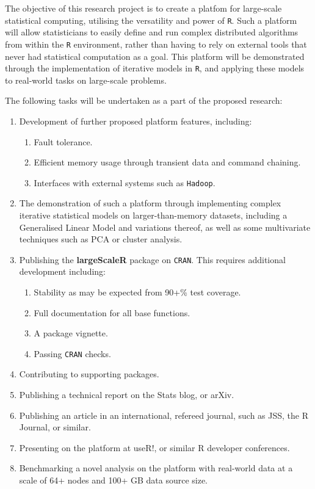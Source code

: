 The objective of this research project is to create a platfom for large-scale statistical computing, utilising the versatility and power of \texttt{R}.
Such a platform will allow statisticians to easily define and run complex distributed algorithms from within the \texttt{R} environment, rather than having to rely on external tools that never had statistical computation as a goal.
This platform will be demonstrated through the implementation of iterative models in \texttt{R}, and applying these models to real-world tasks on large-scale problems.

The following tasks will be undertaken as a part of the proposed research:

\begin{enumerate}
        \item Development of further proposed platform features, including:
                \begin{enumerate}
                        \item Fault tolerance.
                        \item Efficient memory usage through transient data and command chaining.
			\item Interfaces with external systems such as \texttt{Hadoop}.
                \end{enumerate}
        \item The demonstration of such a platform through implementing complex iterative statistical models on larger-than-memory datasets, including a Generalised Linear Model and variations thereof, as well as some multivariate techniques such as PCA or cluster analysis.
	\item Publishing the \textbf{largeScaleR} package on \texttt{CRAN}. This requires additional development including:
                \begin{enumerate}
                        \item Stability as may be expected from 90+\% test coverage.
                        \item Full documentation for all base functions.
                        \item A package vignette.
			\item Passing \texttt{CRAN} checks.
                \end{enumerate}
        \item Contributing to supporting packages.
        \item Publishing a technical report on the Stats blog, or arXiv.
	\item Publishing an article in an international, refereed journal, such as JSS, the R Journal, or similar.
        \item Presenting on the platform at useR!, or similar R developer conferences.
        \item Benchmarking a novel analysis on the platform with real-world data at a scale of 64+ nodes and 100+ GB data source size.
\end{enumerate}
